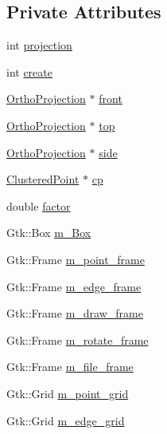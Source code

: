 \subsection*{Private Attributes}
\begin{DoxyCompactItemize}
\item 
int \hyperlink{class_construct_window_a5db9eb781ceacefdfff06d68c30ef108}{projection}
\item 
int \hyperlink{class_construct_window_a0d66cf4e35b57cf6aa806f14bbfc650c}{create}
\item 
\hyperlink{class_ortho_projection}{Ortho\+Projection} $\ast$ \hyperlink{class_construct_window_a241b582859a9abbda9461f99ca1193ad}{front}
\item 
\hyperlink{class_ortho_projection}{Ortho\+Projection} $\ast$ \hyperlink{class_construct_window_a400b924c57cd3a4f09165a5f5862f3cb}{top}
\item 
\hyperlink{class_ortho_projection}{Ortho\+Projection} $\ast$ \hyperlink{class_construct_window_ad2ef07e4940cd866ea8ae64ae1a1b0cb}{side}
\item 
\hyperlink{class_clustered_point}{Clustered\+Point} $\ast$ \hyperlink{class_construct_window_aaed91d05bc404bacfa1ab28fc4e59a18}{cp}
\item 
double \hyperlink{class_construct_window_aa26b3bc47101e701e30105241df3ecba}{factor}
\item 
Gtk\+::\+Box \hyperlink{class_construct_window_aebc12f0722ef5c6e3cf95c1af2cc3eff}{m\+\_\+\+Box}
\item 
Gtk\+::\+Frame \hyperlink{class_construct_window_abf7b3fa2668de59906157f0a079d2643}{m\+\_\+point\+\_\+frame}
\item 
Gtk\+::\+Frame \hyperlink{class_construct_window_a2a8d99900db3b562639c8c6652b9397d}{m\+\_\+edge\+\_\+frame}
\item 
Gtk\+::\+Frame \hyperlink{class_construct_window_a8aaef7a20aa651f1cc1f9530ec5a3a12}{m\+\_\+draw\+\_\+frame}
\item 
Gtk\+::\+Frame \hyperlink{class_construct_window_ac496afbdbf430ed87dc64d5ef9e67b91}{m\+\_\+rotate\+\_\+frame}
\item 
Gtk\+::\+Frame \hyperlink{class_construct_window_a02e692af0641166a72a79069bb59b081}{m\+\_\+file\+\_\+frame}
\item 
Gtk\+::\+Grid \hyperlink{class_construct_window_a83605233173d470b1d1db0332808aa99}{m\+\_\+point\+\_\+grid}
\item 
Gtk\+::\+Grid \hyperlink{class_construct_window_a929eae3d5bd082d159a719af9b7e2674}{m\+\_\+edge\+\_\+grid}

\end{DoxyCompactItemize}
